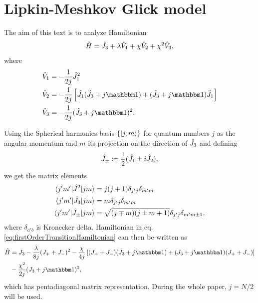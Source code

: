 \chapter{Lipkin-Meshkov Glick model}



The aim of this text is to analyze Hamiltonian
\begin{equation}
    \hat{H}=\hat{J}_3+\lambda\hat V_1 +\chi \hat V_2+\chi^2 \hat V_3,
    \label{eq:firstOrderTransitionHamiltonian}
\end{equation}
where
\begin{align}
    \hat V_1 &=-\frac{1}{2j}\J_1^2\\
    \hat V_2 &= -\frac{1}{2j}\left[\J_1(\J_3+j\Id)+(\J_3+j\Id)\J_1\right]\\
    \hat V_3 &= -\frac{1}{2j}(\J_3+j\Id)^2.
\end{align}



Using the Spherical harmonics basis $\{\ket{j,m}\}$ for quantum numbers $j$ as the angular momentum and $m$ its projection on the direction of $\hat{J}_3$ and defining
\begin{equation}
    \hat{J}_\pm\coloneqq\frac{1}{2}(\hat{J}_1\pm i\hat{J}_2),
\end{equation}
we get the matrix elements
\begin{align}
    \braket{j'm'|\hat{J}^2|jm} &= j(j+1)\delta_{j'j}\delta_{m'm}\\
    \braket{j'm'|\hat{J}_3|jm} &= m \delta_{j'j}\delta_{m'm}\\
    \braket{j'm'|\hat{J}_\pm|jm} &= \sqrt{(j\mp m)(j\pm m+1)}\delta_{j'j}\delta_{m'm\pm 1},
\end{align}
where $\delta_{a'b}$ is Kronecker delta. Hamiltonian in eq. \ref{eq:firstOrderTransitionHamiltonian} can then be written as
\begin{equation}
\begin{split}
        \HH &= J_3-\frac{\lambda}{8j}(J_++J_-)^2-\frac{\chi}{4j}\left[(J_++J_-)(J_3+j\Id)+(J_3+j\Id)(J_++J_-)\right]\\
        &-\frac{\chi^2}{2j}(J_3+j\Id)^2,
\end{split}
\end{equation}
which has pentadiagonal matrix representation. During the whole paper, $j=N/2$ will be used. 

